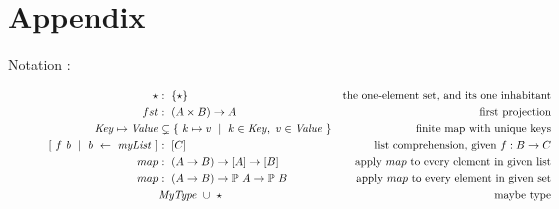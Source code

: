 \section{Appendix}

Notation :

\begin{figure}[htb]
  \begin{align*}
    \emptytype
    & :~\{\emptytype \}
    & \text{the one-element set, and its one inhabitant}
    \\
    \fun{fst}
    & :~(A \times B) \to A
    & \text{first projection}
    \\
    \var{Key} \mapsto \var{Value}
    & \subsetneq \{~ k \mapsto v ~\mid~ k \in \var{Key},~v \in \var{Value}~ \}
    & \text{finite map with unique keys}
    \\
    [~\fun{f}~\var{b}~\mid~\var{b} ~\leftarrow ~\var{myList}~]
    & :~[C]
    & \text{list comprehension, given $\fun{f} : B \to C$}
    \\
    \fun{map}
    & :~(A \to B) \to [A] \to [B]
    & \text{apply $\fun{map}$ to every element in given list}
    \\
    \fun{map}
    & :~(A \to B) \to \powerset{A} \to \powerset{B}
    & \text{apply $\fun{map}$ to every element in given set}
    \\
     & \var{MyType}~ \cup ~\emptytype
    & \text{maybe type}

\end{align*}
\end{figure}
